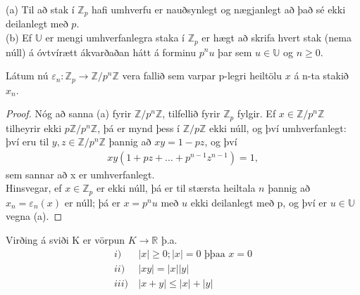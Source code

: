 \begin{setn}
 (a) Til að stak í $\mathbb{Z}_p$ hafi umhverfu er nauðsynlegt og nægjanlegt 
að það sé ekki deilanlegt með $p$.\\
 (b) Ef $\mathbb{U}$ er mengi umhverfanlegra staka í $\mathbb{Z}_p$ er hægt að 
skrifa hvert stak (nema núll) á óvtvírætt ákvarðaðan hátt á forminu $p^nu$ þar
 sem $u \in \mathbb{U}$ og $n\geq 0$.
\end{setn}
Látum nú $\varepsilon_n : \mathbb{Z}_p \rightarrow \mathbb{Z}/p^n 
\mathbb{Z}$ vera fallið sem varpar p-legri heiltölu $x$ á n-ta stakið $x_n$.
\begin{proof}
 Nóg að sanna (a) fyrir $\mathbb{Z}/p^n\mathbb{Z}$, tilfellið fyrir 
$\mathbb{Z}_p$ fylgir. Ef $x \in \mathbb{Z}/p^n\mathbb{Z}$ tilheyrir 
ekki $p\mathbb{Z}/p^n\mathbb{Z}$, þá er mynd þess í 
$\mathbb{Z}/p\mathbb{Z}$ ekki núll, og því umhverfanlegt: 
því eru til $y,z \in \mathbb{Z}/p^n\mathbb{Z}$ þannig að 
$xy = 1-pz$, og því 
\begin{align*}
 xy(1+pz+\ldots+p^{n-1}z^{n-1}) = 1,
\end{align*}
sem sannar að x er umhverfanlegt.\\
Hinsvegar, ef $x \in \mathbb{Z}_p$ er ekki núll, þá er til stærsta heiltala 
$n$ þannig að $x_n = \varepsilon_n(x)$ er núll; þá er $x = p^nu$ með $u$ ekki 
deilanlegt með p, og því er $u \in \mathbb{U}$ vegna (a). 
\end{proof}
\begin{skilgr}
 Virðing á sviði K er vörpun $K \rightarrow \mathbb{R}$ þ.a.
\begin{align*}
 i)& \  |x|\geq 0; |x| = 0 \mbox{ þþaa } x = 0 \\
 ii)& \  |xy| = |x||y| \\
 iii)& \  |x+y| \leq |x| + |y|
\end{align*}
\end{skilgr}
